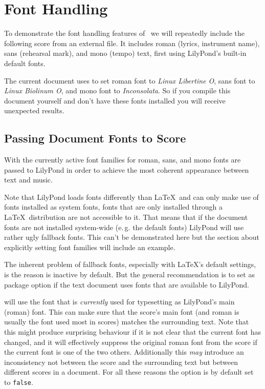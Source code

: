 \documentclass{lyluatexexample}
\begin{document}
\section*{Font Handling}

To demonstrate the font handling features of \lyluatex\ we will repeatedly
include the following score from an external file.  It includes roman (lyrics,
instrument name), sans (rehearsal mark), and mono (tempo) text, first using
LilyPond's built-in default fonts.


\bigskip
The current document uses  to set roman font to \emph{Linux
Libertine O}, sans font to \emph{Linux Biolinum O}, and mono font to
\emph{Inconsolata}. So if you compile this document yourself and don't have
these fonts installed you will receive unexpected results.

\subsection*{Passing Document Fonts to Score}

With  the currently active font families for roman, sans, and
mono fonts are passed to LilyPond in order to achieve the most coherent
appearance between text and music.

\bigskip


\bigskip
Note that LilyPond loads fonts differently than \LaTeX\ and can only make use of
fonts installed as system fonts, fonts that are only installed through a \LaTeX\
distribution are not accessible to it. That means that if the document fonts are
not installed system-wide (e.\,g. the default fonts) LilyPond will use rather
ugly fallback fonts. This can't be demonstrated here but the section about
explicitly setting font families will include an example.

The inherent problem of fallback fonts, especially with \LaTeX's default
settings, is the reason  is inactive by default. But the
general recommendation is to set \option{pass-fonts} as package option if the
text document uses fonts that are available to LilyPond.

\bigskip

\sffamily {} will use the font that is
\emph{currently} used for typesetting as LilyPond's main (roman) font. This can
make sure that the score's main font (and roman is usually the font used most in
scores) matches the surrounding text. Note that this might produce surprising
behaviour if it is not clear that the current font has changed, and it will
effectively suppress the original roman font from the score if the current font
is one of the two others. Additionally this \emph{may} introduce an
inconsistency not between the score and the surrounding text but between
different scores in a document. For all these reasons the option is by default
set to \texttt{false}.
\end{document}
